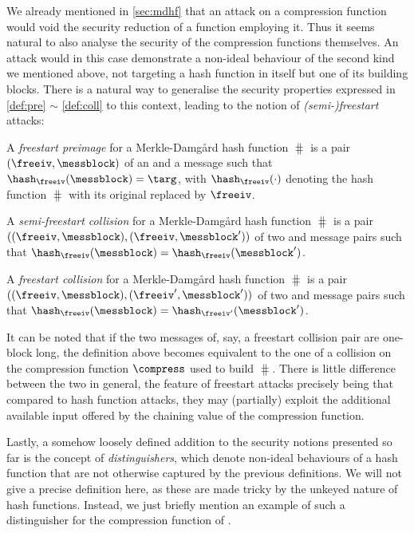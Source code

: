 \bigskip

We already mentioned in \autoref{sec:mdhf} that an attack on a compression function would void the security reduction of a \merkdam function employing it. Thus it seems natural to also
analyse the security of the compression functions themselves. An attack would in this case demonstrate a non-ideal behaviour of the second kind we mentioned above, not targeting
a hash function in itself but one of its building blocks. There is a natural way to generalise the security properties expressed in \autoref{def:pre} $\sim$ \autoref{def:coll} to this context,
leading to the notion of \emph{(semi-)freestart} attacks:

\begin{defi}
A \emph{freestart preimage} for a Merkle-Damg\aa rd hash function $\hash$ is a pair $(\freeiv,\messblock)$
of an \iv and a message such that $\hash_\freeiv(\messblock) = \targ$, with $\hash_\freeiv(\cdot)$ denoting
the hash function $\hash$ with its original \iv replaced by $\freeiv$.
\end{defi}

\begin{defi}
A \emph{semi-freestart collision} for a Merkle-Damg\aa rd hash function $\hash$ is a pair $((\freeiv,\messblock), (\freeiv,\messblock'))$
of two \iv and message pairs such that $\hash_\freeiv(\messblock) = \hash_{\freeiv}(\messblock')$.
\end{defi}

\begin{defi}
A \emph{freestart collision} for a Merkle-Damg\aa rd hash function $\hash$ is a pair $((\freeiv,\messblock), (\freeiv',\messblock'))$
of two \iv and message pairs such that $\hash_\freeiv(\messblock) = \hash_{\freeiv'}(\messblock')$.
\end{defi}

It can be noted that if the two messages of, say, a freestart collision pair are one-block long, the definition above becomes equivalent to the one of a collision
on the compression function $\compress$ used to build $\hash$.
There is little difference between the two in general, the feature of freestart attacks precisely being that compared to hash function attacks, they may (partially) exploit the additional available input offered by the chaining value
of the compression function.


\bigskip

Lastly, a somehow loosely defined addition to the security notions presented so far is the concept of \emph{distinguishers}, which denote non-ideal behaviours
of a hash function that are not otherwise captured by the previous definitions. We will not give a precise definition here, as these are made tricky by
the unkeyed nature of hash functions. Instead, we just briefly mention an example of such a distinguisher for the compression function of \shaone.

